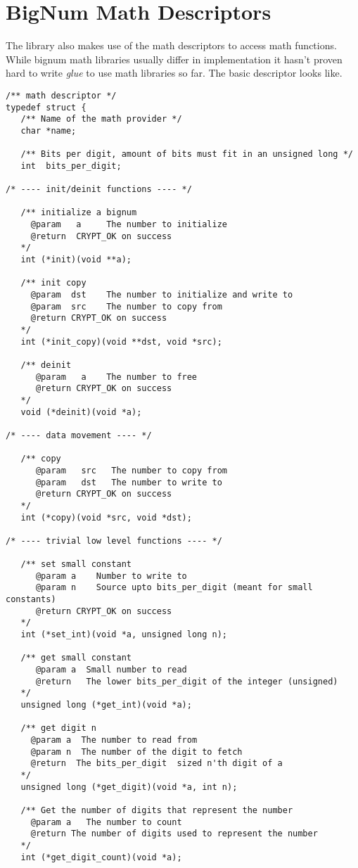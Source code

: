\documentclass[synpaper]{book}
\newcommand{\mysection}[1]    %
	{                   %
	\section{#1}
   \markboth{\textsf{www.libtom.org}}{\thesection ~ {#1}}
	}
\begin{document}
\mysection{BigNum Math Descriptors}
The library also makes use of the math descriptors to access math functions.  While bignum math libraries usually differ in implementation
it hasn't proven hard to write \textit{glue} to use math libraries so far.  The basic descriptor looks like.

\begin{small}
\begin{verbatim}
/** math descriptor */
typedef struct {
   /** Name of the math provider */
   char *name;

   /** Bits per digit, amount of bits must fit in an unsigned long */
   int  bits_per_digit;

/* ---- init/deinit functions ---- */

   /** initialize a bignum
     @param   a     The number to initialize
     @return  CRYPT_OK on success
   */
   int (*init)(void **a);
   
   /** init copy 
     @param  dst    The number to initialize and write to
     @param  src    The number to copy from
     @return CRYPT_OK on success
   */
   int (*init_copy)(void **dst, void *src);

   /** deinit 
      @param   a    The number to free
      @return CRYPT_OK on success
   */
   void (*deinit)(void *a);

/* ---- data movement ---- */

   /** copy 
      @param   src   The number to copy from
      @param   dst   The number to write to 
      @return CRYPT_OK on success
   */
   int (*copy)(void *src, void *dst);

/* ---- trivial low level functions ---- */

   /** set small constant 
      @param a    Number to write to
      @param n    Source upto bits_per_digit (meant for small constants) 
      @return CRYPT_OK on success
   */
   int (*set_int)(void *a, unsigned long n);

   /** get small constant 
      @param a  Small number to read
      @return   The lower bits_per_digit of the integer (unsigned)
   */
   unsigned long (*get_int)(void *a);

   /** get digit n 
     @param a  The number to read from
     @param n  The number of the digit to fetch
     @return  The bits_per_digit  sized n'th digit of a
   */
   unsigned long (*get_digit)(void *a, int n);

   /** Get the number of digits that represent the number
     @param a   The number to count
     @return The number of digits used to represent the number
   */
   int (*get_digit_count)(void *a);


\end{verbatim}
\end{small}
\end{document}
